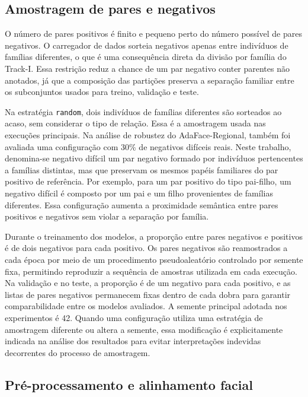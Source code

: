 \subsection{Amostragem de pares e negativos}

O número de pares positivos é finito e pequeno perto do número possível de pares negativos. O carregador de dados sorteia negativos apenas entre indivíduos de famílias diferentes, o que é uma consequência direta da divisão por família do Track-I. Essa restrição reduz a chance de um par negativo conter parentes não anotados, já que a composição das partições preserva a separação familiar entre os subconjuntos usados para treino, validação e teste.

Na estratégia \texttt{random}, dois indivíduos de famílias diferentes são sorteados ao acaso, sem considerar o tipo de relação. Essa é a amostragem usada nas execuções principais. Na análise de robustez do AdaFace-Regional, também foi avaliada uma configuração com 30\% de negativos difíceis reais. Neste trabalho, denomina-se negativo difícil um par negativo formado por indivíduos pertencentes a famílias distintas, mas que preservam os mesmos papéis familiares do par positivo de referência. Por exemplo, para um par positivo do tipo pai-filho, um negativo difícil é composto por um pai e um filho provenientes de famílias diferentes. Essa configuração aumenta a proximidade semântica entre pares positivos e negativos sem violar a separação por família.

Durante o treinamento dos modelos, a proporção entre pares negativos e positivos é de dois negativos para cada positivo. Os pares negativos são reamostrados a cada época por meio de um procedimento pseudoaleatório controlado por semente fixa, permitindo reproduzir a sequência de amostras utilizada em cada execução. Na validação e no teste, a proporção é de um negativo para cada positivo, e as listas de pares negativos permanecem fixas dentro de cada dobra para garantir comparabilidade entre os modelos avaliados. A semente principal adotada nos experimentos é 42. Quando uma configuração utiliza uma estratégia de amostragem diferente ou altera a semente, essa modificação é explicitamente indicada na análise dos resultados para evitar interpretações indevidas decorrentes do processo de amostragem.

\subsection{Pré-processamento e alinhamento facial}

